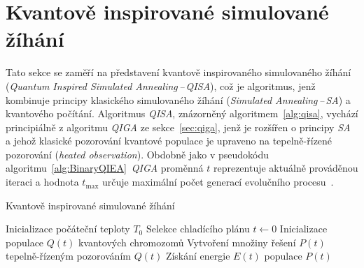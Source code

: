 \section{Kvantově inspirované simulované žíhání}\label{sec:qisa}
Tato sekce se zaměří na představení kvantově inspirovaného simulovaného žíhání (\emph{Quantum Inspired Simulated Annealing\,--\,QISA}), což je algoritmus, jenž kombinuje principy klasického simulovaného žíhání (\emph{Simulated Annealing\,--\,SA}) a kvantového počítání. 
Algoritmus \emph{QISA}, znázorněný algoritmem~\ref{alg:qisa}, vychází principiálně z algoritmu \emph{QIGA} ze sekce~\ref{sec:qiga}, jenž je rozšířen o principy \emph{SA} a jehož klasické pozorování kvantové populace je upraveno na tepelně-řízené pozorování (\emph{heated observation}). 
Obdobně jako v pseudokódu algoritmu~\ref{alg:BinaryQIEA}~\emph{QIGA} proměnná $t$ reprezentuje aktuálně prováděnou iteraci a hodnota $t_{\text{max}}$ určuje maximální počet generací evolučního procesu~\cite{qisa}. 

\begin{algorithm}[ht]
    \caption{Kvantově inspirované simulované žíhání~\cite{qisa}}
    \label{alg:qisa}
    Inicializace počáteční teploty $T_0$\;
    Selekce chladícího plánu\;
    $t \gets 0$\;
    Inicializace populace $Q\left(t\right)$ kvantových chromozomů\;
    Vytvoření množiny řešení $P\left(t\right)$ tepelně-řízeným pozorováním $Q\left(t\right)$\;
    Získání energie $E\left(t\right)$ populace $P\left(t\right)$\;
\end{algorithm}

